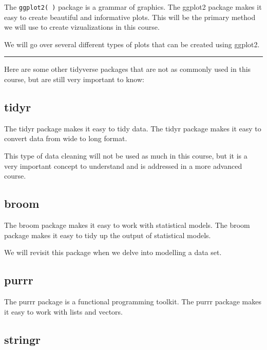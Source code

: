 \documentclass[
  letterpaper,
  DIV=11,
  numbers=noendperiod]{scrreprt}
\begin{document}
The \texttt{ggplot2(\ )} package is a grammar of graphics. The ggplot2
package makes it easy to create beautiful and informative plots. This
will be the primary method we will use to create vizualizations in this
course.

We will go over several different types of plots that can be created
using ggplot2.

\begin{center}\rule{0.5\linewidth}{0.5pt}\end{center}

Here are some other tidyverse packages that are not as commonly used in
this course, but are still very important to know:

\subsection*{tidyr}\label{tidyr}

The tidyr package makes it easy to tidy data. The tidyr package makes it
easy to convert data from wide to long format.

This type of data cleaning will not be used as much in this course, but
it is a very important concept to understand and is addressed in a more
advanced course.

\subsection*{broom}\label{broom}

The broom package makes it easy to work with statistical models. The
broom package makes it easy to tidy up the output of statistical models.

We will revisit this package when we delve into modelling a data set.

\subsection*{purrr}\label{purrr}

The purrr package is a functional programming toolkit. The purrr package
makes it easy to work with lists and vectors.

\subsection*{stringr}\label{stringr}
\end{document}
